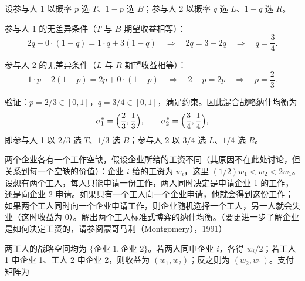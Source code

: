 \sol
设参与人 1 以概率 $p$ 选 $T$、$1-p$ 选 $B$；参与人 2 以概率 $q$ 选 $L$、$1-q$ 选 $R$。


参与人 1 的无差异条件（$T$ 与 $B$ 期望收益相等）：
\[
  2q+0\cdot(1-q)=1\cdot q+3(1-q)
  \quad\Longrightarrow\quad
  2q=3-2q
  \quad\Longrightarrow\quad
  q=\frac34.
\]

参与人 2 的无差异条件（$L$ 与 $R$ 期望收益相等）：
\[
  1\cdot p+2(1-p)=2p+0\cdot(1-p)
  \quad\Longrightarrow\quad
  2-p=2p
  \quad\Longrightarrow\quad
  p=\frac23.
\]

验证：$p=2/3\in[0,1]$，$q=3/4\in[0,1]$，满足约束。因此混合战略纳什均衡为
\[
  \boxed{\sigma_1^*=\Bigl(\frac23,\frac13\Bigr),\qquad
          \sigma_2^*=\Bigl(\frac34,\frac14\Bigr)},
\]\indent
即参与人 1 以 $2/3$ 选 $T$、$1/3$ 选 $B$；参与人 2 以 $3/4$ 选 $L$、$1/4$ 选 $R$。

两个企业各有一个工作空缺，假设企业所给的工资不同（其原因不在此处讨论，但关系到每一个空缺的价值）：企业 $i$ 给的工资为 $w_i$，这里 $(1/2)w_1<w_2<2w_1$。设想有两个工人，每人只能申请一份工作，两人同时决定是申请企业 1 的工作，还是向企业 2 申请。如果只有一个工人向一个企业申请，他就会得到这份工作；如果两个工人同时向一个企业申请工作，则企业随机选择一个工人，另一人就会失业（这时收益为 $0$）。解出两个工人标准式博弈的纳什均衡。（要更进一步了解企业是如何决定工资的，请参阅蒙哥马利（Montgomery），1991）

\sol
两工人的战略空间均为 $\{\text{企业 1},\text{企业 2}\}$。若两人同申企业 $i$，各得 $w_i/2$；若工人 1 申企业 1、工人 2 申企业 2，则收益为 $(w_1,w_2)$；反之则为 $(w_2,w_1)$。支付矩阵为

